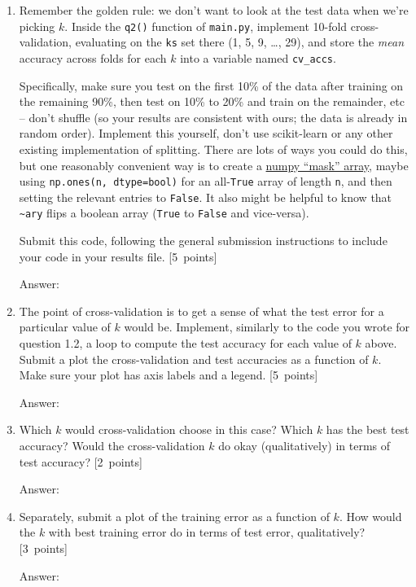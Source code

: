 \documentclass{article}
\newcommand{\blu}[1]{{\textcolor{blu}{#1}}}
\newenvironment{answer}{\par\begingroup\color{gre}Answer: }{\endgroup}
\let\ask\blu
\newcommand\pts[1]{\textcolor{pointscolour}{[#1~points]}}
\begin{document}
    \begin{enumerate}
        \item Remember the golden rule: we don't want to look at the test data when we're picking $k$. Inside the \texttt{q2()} function of \texttt{main.py}, implement 10-fold cross-validation, evaluating on the \texttt{ks} set there (1, 5, 9, \dots, 29), and store the \emph{mean} accuracy across folds for each $k$ into a variable named \texttt{cv\_accs}.

        Specifically, make sure you test on the first 10\% of the data after training on the remaining 90\%, then test on 10\% to 20\% and train on the remainder, etc -- don't shuffle (so your results are consistent with ours; the data is already in random order). Implement this yourself, don't use scikit-learn or any other existing implementation of splitting. There are lots of ways you could do this, but one reasonably convenient way is to create a \href{https://numpy.org/doc/stable/user/basics.indexing.html#boolean-or-mask-index-arrays}{numpy ``mask'' array}, maybe using \texttt{np.ones(n, dtype=bool)} for an all-\texttt{True} array of length \texttt{n}, and then setting the relevant entries to \texttt{False}. It also might be helpful to know that \texttt{\textasciitilde ary} flips a boolean array (\texttt{True} to \texttt{False} and vice-versa).

        \ask{Submit this code}, following the general submission instructions to include your code in your results file. \pts{5}
        \begin{answer}

        \end{answer}
        \item The point of cross-validation is to get a sense of what the test error for a particular value of $k$ would be. Implement, similarly to the code you wrote for question 1.2, a loop to compute the test accuracy for each value of $k$ above. \ask{Submit a plot the cross-validation and test accuracies as a function of $k$.} Make sure your plot has axis labels and a legend. \pts{5}
        \begin{answer}

        \end{answer}
        \item Which $k$ would cross-validation choose in this case? Which $k$ has the best test accuracy? Would the cross-validation $k$ do okay (qualitatively) in terms of test accuracy? \pts{2}
        \begin{answer}

        \end{answer}
        \item Separately, \ask{submit a plot of the training error as a function of $k$. How would the $k$ with best training error do in terms of test error, qualitatively?} \pts{3}
        \begin{answer}

        \end{answer}
    \end{enumerate}
\end{document}
